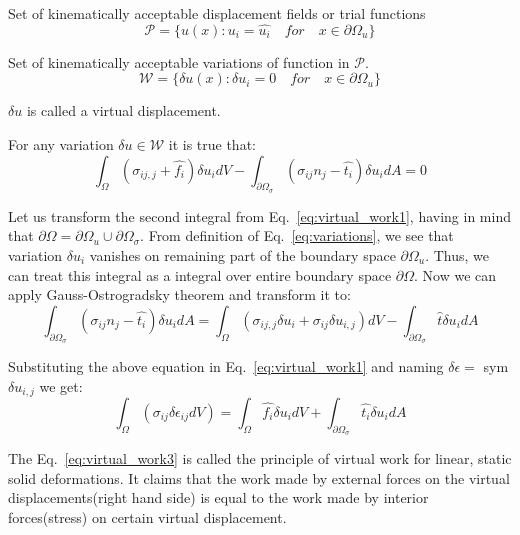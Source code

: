 \documentclass[en]{minipw} %
\begin{document}
Set of kinematically acceptable displacement fields or trial functions
\begin{equation}
\mathcal{P} = \{ u(x) : u_i = \hat{u_i} \quad for \quad x \in \partial \Omega_{u} \}
\end{equation}

Set of kinematically acceptable variations of function in $\mathcal{P}$.
\begin{equation}
\label{eq:variations}
\mathcal{W} = \{ \delta u(x) : \delta u_i = 0 \quad for \quad x \in \partial \Omega_{u} \}
\end{equation}

$\delta u$ is called a virtual displacement. 

For any variation $\delta u \in \mathcal{W}$ it is true that:
\begin{equation}
\label{eq:virtual_work1}
\int_{\Omega}(\sigma_{ij,j} + \hat{f_i}) \delta u_{i} dV - \int_{\partial \Omega_{\sigma}}(\sigma_{ij}n_{j} - \hat{t_{i}}) \delta u_{i}dA = 0
\end{equation}

Let us transform the second integral from Eq.~\ref{eq:virtual_work1}, having in mind that $\partial \Omega = \partial \Omega_{u} \cup \partial \Omega_{\sigma}$. From definition of Eq.~\ref{eq:variations}, we see that variation $\delta u_{i}$ vanishes on remaining part of the boundary space $\partial \Omega_{u}$. Thus, we can treat this integral as a integral over entire boundary space $\partial \Omega$. Now we can apply Gauss-Ostrogradsky theorem and transform it to:
\begin{equation}
\label{eq:virtual_work2}
\int_{\partial \Omega_{\sigma}}(\sigma_{ij}n_{j} - \hat{t_{i}}) \delta u_{i}dA = \int_{\Omega}(\sigma_{ij,j} \delta u_{i} + \sigma_{ij} \delta u_{i,j}) dV - \int_{\partial \Omega_{\sigma}} \hat{t} \delta u_i dA
\end{equation}

Substituting the above equation in Eq.~\ref{eq:virtual_work1} and naming $\delta \epsilon =$ sym $\delta u_{i,j}$ we get:
\begin{equation}
\label{eq:virtual_work3}
\int_{\Omega}(\sigma_{ij} \delta \epsilon_{ij} dV ) = \int_{\Omega} \hat{f_i} \delta u_{i} dV + \int_{\partial \Omega_{\sigma}} \hat{t_i} \delta u_{i} dA
\end{equation}

The Eq.~\ref{eq:virtual_work3} is called the principle of virtual work for linear, static solid deformations. It claims that the work made by external forces on the virtual displacements(right hand side) is equal to the work made by interior forces(stress) on certain virtual displacement.
\end{document}
